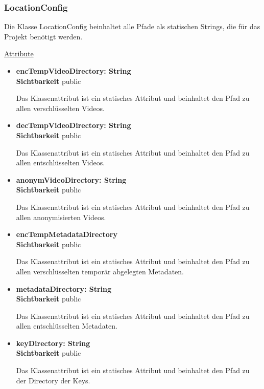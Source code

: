 \subsubsection{LocationConfig}
Die Klasse LocationConfig beinhaltet alle Pfade als statischen Strings, die für das Projekt benötigt werden.

\underline{Attribute}
\begin{itemize}
\itemsep0pt
\item \textbf{encTempVideoDirectory: String} \hfill\\ 
\textbf{Sichtbarkeit} public

Das Klassenattribut ist ein statisches Attribut und beinhaltet den Pfad zu allen verschlüsselten Videos.

\item \textbf{decTempVideoDirectory: String} \hfill\\ 
\textbf{Sichtbarkeit} public
 
Das Klassenattribut ist ein statisches Attribut und beinhaltet den Pfad zu allen entschlüsselten Videos.

\item \textbf{anonymVideoDirectory: String} \hfill\\ 
\textbf{Sichtbarkeit} public

Das Klassenattribut ist ein statisches Attribut und beinhaltet den Pfad zu allen anonymisierten Videos.

\item \textbf{encTempMetadataDirectory} \hfill\\ 
\textbf{Sichtbarkeit} public

Das Klassenattribut ist ein statisches Attribut und beinhaltet den Pfad zu allen verschlüsselten temporär abgelegten Metadaten.

\item \textbf{metadataDirectory: String} \hfill\\ 
\textbf{Sichtbarkeit} public

Das Klassenattribut ist ein statisches Attribut und beinhaltet den Pfad zu allen entschlüsselten Metadaten.

\item \textbf{keyDirectory: String} \hfill\\ 
\textbf{Sichtbarkeit} public

Das Klassenattribut ist ein statisches Attribut und beinhaltet den Pfad zu der Directory der Keys.
\end{itemize}